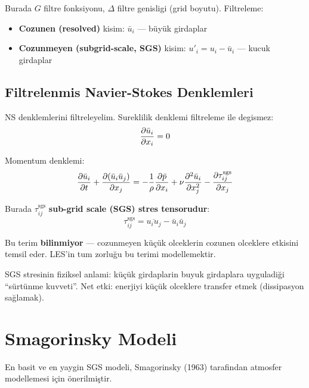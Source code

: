 Burada $G$ filtre fonksiyonu, $\Delta$ filtre genisligi (grid boyutu). Filtreleme:
\begin{itemize}
\item \textbf{Cozunen (resolved)} kisim: $\bar{u}_i$ --- büyük girdaplar
\item \textbf{Cozunmeyen (subgrid-scale, SGS)} kisim: $u'_i = u_i - \bar{u}_i$ --- kucuk girdaplar
\end{itemize}

\subsection{Filtrelenmis Navier-Stokes Denklemleri}

NS denklemlerini filtreleyelim. Sureklilik denklemi filtreleme ile degismez:
\begin{equation}
\frac{\partial \bar{u}_i}{\partial x_i} = 0
\end{equation}

Momentum denklemi:
\begin{equation}
\frac{\partial \bar{u}_i}{\partial t} + \frac{\partial (\bar{u}_i\bar{u}_j)}{\partial x_j} = -\frac{1}{\rho}\frac{\partial \bar{p}}{\partial x_i} + \nu\frac{\partial^2 \bar{u}_i}{\partial x_j^2} - \frac{\partial \tau_{ij}^{\text{sgs}}}{\partial x_j}
\label{eq:les_ns}
\end{equation}

Burada $\tau_{ij}^{\text{sgs}}$ \textbf{sub-grid scale (SGS) stres tensorudur}:
\begin{equation}
\tau_{ij}^{\text{sgs}} = \overline{u_i u_j} - \bar{u}_i\bar{u}_j
\label{eq:sgs_stress}
\end{equation}

Bu terim \textbf{bilinmiyor} --- cozunmeyen küçük olceklerin cozunen olceklere etkisini temsil eder. LES'in tum zorluğu bu terimi modellemektir.

\begin{remark}
SGS stresinin fiziksel anlami: küçük girdaplarin buyuk girdaplara uyguladiği ``sürtünme kuvveti''. Net etki: enerjiyi küçük olceklere transfer etmek (dissipasyon sağlamak).
\end{remark}


\section{Smagorinsky Modeli}
\label{sec:smagorinsky}

En basit ve en yaygin SGS modeli, Smagorinsky (1963) tarafindan atmosfer modellemesi için önerilmiştir.

